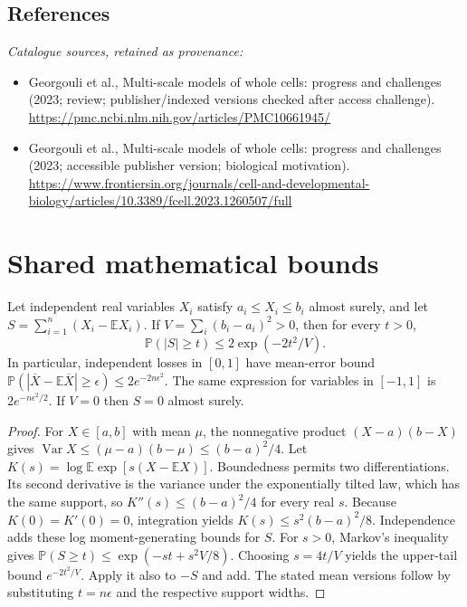 \documentclass[11pt]{article}
\begin{document}
\subsection{References}
\noindent\emph{Catalogue sources, retained as provenance:}
\begin{itemize}
\item Georgouli et al., Multi-scale models of whole cells: progress and challenges (2023; review; publisher/indexed versions checked after access challenge). \url{https://pmc.ncbi.nlm.nih.gov/articles/PMC10661945/}
\item Georgouli et al., Multi-scale models of whole cells: progress and challenges (2023; accessible publisher version; biological motivation). \url{https://www.frontiersin.org/journals/cell-and-developmental-biology/articles/10.3389/fcell.2023.1260507/full}
\end{itemize}




\section{Shared mathematical bounds}\label{app:bounds}
\begin{lemma}\label{lem:bounded}
Let independent real variables $X_i$ satisfy $a_i\leq X_i\leq b_i$ almost surely,
and let $S=\sum_{i=1}^n(X_i-\mathbb{E} X_i)$. If
$V=\sum_i(b_i-a_i)^2>0$, then for every $t>0$,
\[
 \mathbb{P}(|S|\geq t)\leq 2\exp(-2t^2/V).
\]
In particular, independent losses in $[0,1]$ have mean-error bound
$\mathbb{P}(|\overline X-\mathbb{E}\overline X|\geq\epsilon)
\leq2e^{-2n\epsilon^2}$. The same expression for variables in $[-1,1]$
is $2e^{-n\epsilon^2/2}$. If $V=0$ then $S=0$ almost surely.
\end{lemma}
\begin{proof}
For $X\in[a,b]$ with mean $\mu$, the nonnegative product
$(X-a)(b-X)$ gives
$\operatorname{Var} X\leq(\mu-a)(b-\mu)\leq(b-a)^2/4$.
Let $K(s)=\log\mathbb{E}\exp[s(X-\mathbb{E} X)]$.
Boundedness permits two differentiations. Its second derivative is the variance
under the exponentially tilted law, which has the same support, so
$K''(s)\leq(b-a)^2/4$ for every real $s$.
Because $K(0)=K'(0)=0$, integration yields
$K(s)\leq s^2(b-a)^2/8$.
Independence adds these log moment-generating bounds for $S$.
For $s>0$, Markov's inequality gives
$\mathbb{P}(S\geq t)\leq\exp(-st+s^2V/8)$.
Choosing $s=4t/V$ yields the upper-tail bound $e^{-2t^2/V}$.
Apply it also to $-S$ and add. The stated mean versions follow by substituting
$t=n\epsilon$ and the respective support widths.
\end{proof}
\end{document}

